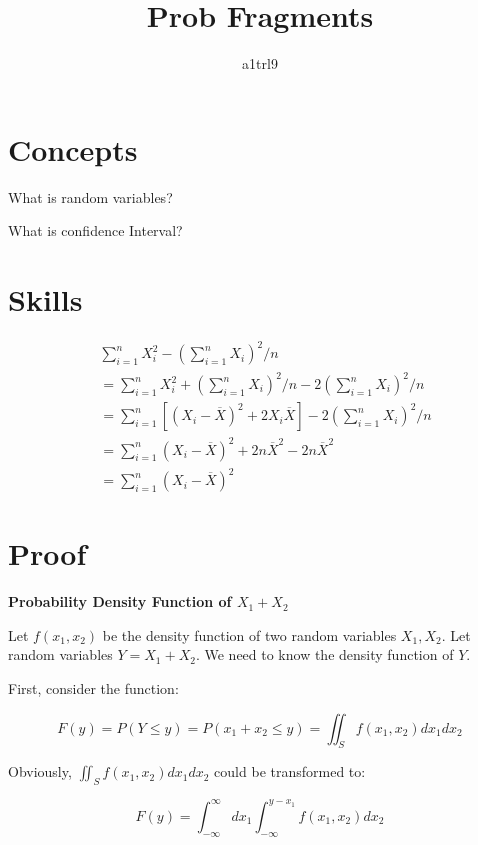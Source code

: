 \documentclass{article}
\title{Prob Fragments}
\author{a1trl9}
\date{}
\begin{document}
\maketitle

\section{Concepts}

What is random variables?

What is confidence Interval?

\section{Skills}

\begin{equation}
\begin{split}
&\sum_{i=1}^nX_i^2-(\sum_{i=1}^nX_i)^2/n \\
&=\sum_{i=1}^nX_i^2+(\sum_{i=1}^nX_i)^2/n-2(\sum_{i=1}^nX_i)^2/n\\
&=\sum_{i=1}^n[(X_i-\overline{X})^2 + 2X_i\overline{X}] -2(\sum_{i=1}^nX_i)^2/n\\
&=\sum_{i=1}^n(X_i-\overline{X})^2 + 2n\overline{X}^2-2n\overline{X}^2\\
&=\sum_{i=1}^n(X_i-\overline{X})^2
\end{split}
\end{equation}


\section{Proof}

\textbf{Probability Density Function of \(X_1+X_2\)}

Let \(f(x_1, x_2)\) be the density function of two random variables \(X_1, X_2\). Let random variables \(Y=X_1 + X_2\). We need to know the density function
of \(Y\).

First, consider the function:

\begin{equation}
F(y) = P(Y \leq y)=P(x_1+x_2\leq y)=\iint_Sf(x_1,x_2)dx_1dx_2
\end{equation}

Obviously, $\iint_Sf(x_1,x_2)dx_1dx_2$ could be transformed to:

\begin{equation}
F(y) = \int_{-\infty}^{\infty}dx_1\int_{-\infty}^{y-x_1}f(x_1,x_2)dx_2
\end{equation}
\end{document}

